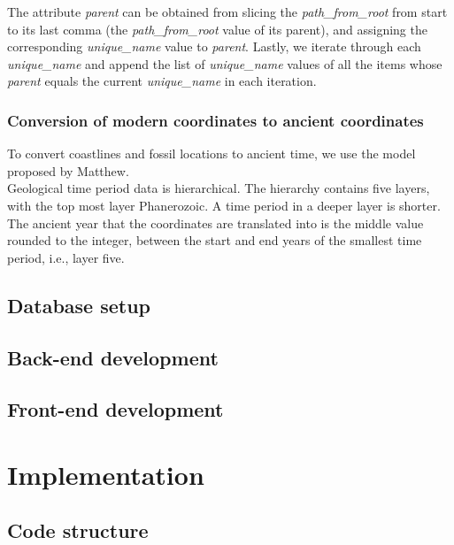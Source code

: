 \documentclass[11pt, a4paper,oneside,chapterprefix=false]{scrbook}
\begin{document}
The attribute \emph{parent} can be obtained from slicing the \emph{path\_from\_root} from start to its last comma (the \emph{path\_from\_root} value of its parent), and assigning the corresponding \emph{unique\_name} value to \emph{parent}. Lastly, we iterate through each \emph{unique\_name} and append the list of \emph{unique\_name} values of all the items whose \emph{parent} equals the current \emph{unique\_name} in each iteration.

\subsection{Conversion of modern coordinates to ancient coordinates} \label{subsec:coordinate_conversion}
To convert coastlines and fossil locations to ancient time, we use the model proposed by Matthew. \\

Geological time period data is hierarchical. The hierarchy contains five layers, with the top most layer Phanerozoic. A time period in a deeper layer is shorter. The ancient year that the coordinates are translated into is the middle value rounded to the integer, between the start and end years of the smallest time period, i.e., layer five. 

\section{Database setup} \label{sec:tec_database_setup}


\section{Back-end development} \label{sec:tec_backend}


\section{Front-end development} \label{sec:tec_frontend}


\chapter{Implementation} \label{chp:implementation}
\section{Code structure} \label{sec:implementation_code_structure}
\end{document}
